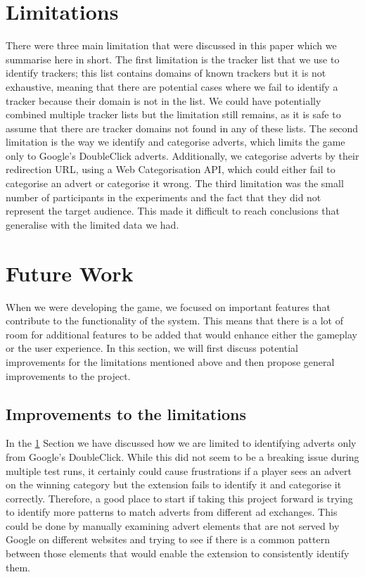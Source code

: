 \documentclass{l4proj}
\begin{document}
\section{Limitations}
\label{limitations}
There were three main limitation that were discussed in this paper which we summarise here in short. The first limitation is the tracker list that we use to identify trackers; this list contains domains of known trackers but it is not exhaustive, meaning that there are potential cases where we fail to identify a tracker because their domain is not in the list. We could have potentially combined multiple tracker lists but the limitation still remains, as it is safe to assume that there are tracker domains not found in any of these lists. The second limitation is the way we identify and categorise adverts, which limits the game only to Google's DoubleClick adverts. Additionally, we categorise adverts by their redirection URL, using a Web Categorisation API, which could either fail to categorise an advert or categorise it wrong. The third limitation was the small number of participants in the experiments and the fact that they did not represent the target audience. This made it difficult to reach conclusions that generalise with the limited data we had.

\section{Future Work}
When we were developing the game, we focused on important features that contribute to the functionality of the system. This means that there is a lot of room for additional features to be added that would enhance either the gameplay or the user experience. In this section, we will first discuss potential improvements for the limitations mentioned above and then propose general improvements to the project.

\subsection{Improvements to the limitations}
In the \ref{limitations} Section we have discussed how we are limited to identifying adverts only from Google's DoubleClick. While this did not seem to be a breaking issue during multiple test runs, it certainly could cause frustrations if a player sees an advert on the winning category but the extension fails to identify it and categorise it correctly. Therefore, a good place to start if taking this project forward is trying to identify more patterns to match adverts from different ad exchanges. This could be done by manually examining advert elements that are not served by Google on different websites and trying to see if there is a common pattern between those elements that would enable the extension to consistently identify them. 
\end{document}
